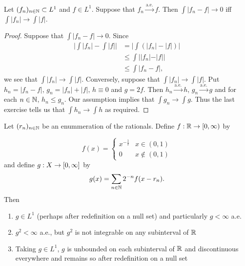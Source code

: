 \documentclass{book}
\begin{document}
	\begin{ex}  
		Let $(f_n)_{n \in \mathbb{N}} \subset L^1$ and $f \in L^1$. Suppose that $f_n \xrightarrow{\text{a.e.}} f$. Then $\int |f_n - f| \rightarrow 0$ iff $\int |f_n| \rightarrow \int |f|$.
	\end{ex}
	
	\begin{proof}
		Suppose that $\int |f_n - f| \rightarrow 0$. Since 
		\begin{align*}
			\bigg|\int |f_n| - \int |f|\bigg| 
			&= \bigg|\int (|f_n| - |f|)\bigg|\\
			&\leq \int ||f_n| - |f||\\
			&\leq \int |f_n - f|,
		\end{align*}
		we see that $\int |f_n| \rightarrow \int |f|$. Conversely, suppose that $\int |f_n| \rightarrow \int |f|$. Put $h_n = |f_n-f|$,  $g_n = |f_n| + |f|$, $h \equiv 0$ and $g = 2f$. Then $h_n \xrightarrow{\text{a.e.}} h$, $g_n \xrightarrow{\text{a.e.}} g$ and for each $n \in \mathbb{N}$, $h_n \leq g_n$. Our assumption implies that $\int g_n \rightarrow \int g$. Thus the last exercise tells us that $\int h_n \rightarrow \int h$ as required. 
		
	\end{proof}
	
	\begin{ex}  
		Let $(r_n)_{n \in \mathbb{N}}$ be an enummeration of the rationals. Define $f: \mathbb{R} \rightarrow [0,\infty)$ by 
		
		\[ f(x) = \begin{cases} 
			x^{-\frac{1}{2}} & x \in (0,1) \\
			0 & x \not\in (0,1)
		\end{cases}
		\]
		and define $g: X \rightarrow [0,\infty]$ by 
		$$g(x) = \sum_{n \in \mathbb{N}}2^{-n}f(x -r_n).$$
		Then 
		\begin{enumerate}
			\item $g \in L^1$ (perhaps after redefinition on a null set) and particularly $g < \infty$ a.e. 
			\item $g^2 < \infty$ a.e., but $g^2$ is not integrable on any subinterval of $\mathbb{R}$
			\item Taking $g \in L^1$, $g$ is unbounded on each subinterval of $\mathbb{R}$ and discontinuous everywhere and remains so after redefinition on a null set
		\end{enumerate}
	\end{ex}
	
\end{document}
